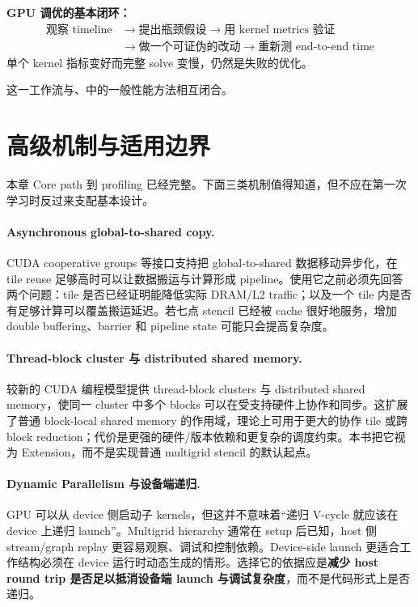 \begin{keybox}
\textbf{GPU 调优的基本闭环：}
\[
\boxed{
\begin{aligned}
\text{观察 timeline}
&\rightarrow
\text{提出瓶颈假设}
\rightarrow
\text{用 kernel metrics 验证}\\
&\rightarrow
\text{做一个可证伪的改动}
\rightarrow
\text{重新测 end-to-end time}
\end{aligned}}
\]
单个 kernel 指标变好而完整 solve 变慢，仍然是失败的优化。
\end{keybox}

这一工作流与、中的一般性能方法相互闭合。

\section{高级机制与适用边界}
\label{sec:gpu-advanced-features}

本章 Core path 到 profiling 已经完整。下面三类机制值得知道，但不应在第一次学习时反过来支配基本设计。

\paragraph{Asynchronous global-to-shared copy.}
CUDA cooperative groups 等接口支持把 global-to-shared 数据移动异步化，在 tile reuse 足够高时可以让数据搬运与计算形成 pipeline\cite{cudaProgramming2026}。使用它之前必须先回答两个问题：tile 是否已经证明能降低实际 DRAM/L2 traffic；以及一个 tile 内是否有足够计算可以覆盖搬运延迟。若七点 stencil 已经被 cache 很好地服务，增加 double buffering、barrier 和 pipeline state 可能只会提高复杂度。

\paragraph{Thread-block cluster 与 distributed shared memory.}
较新的 CUDA 编程模型提供 thread-block clusters 与 distributed shared memory，使同一 cluster 中多个 blocks 可以在受支持硬件上协作和同步\cite{cudaProgramming2026}。这扩展了普通 block-local shared memory 的作用域，理论上可用于更大的协作 tile 或跨 block reduction；代价是更强的硬件/版本依赖和更复杂的调度约束。本书把它视为 Extension，而不是实现普通 multigrid stencil 的默认起点。

\paragraph{Dynamic Parallelism 与设备端递归.}
GPU 可以从 device 侧启动子 kernels，但这并不意味着“递归 V-cycle 就应该在 device 上递归 launch”。Multigrid hierarchy 通常在 setup 后已知，host 侧 stream/graph replay 更容易观察、调试和控制依赖。Device-side launch 更适合工作结构必须在 device 运行时动态生成的情形。选择它的依据应是\textbf{减少 host round trip 是否足以抵消设备端 launch 与调试复杂度}，而不是代码形式上是否递归。

